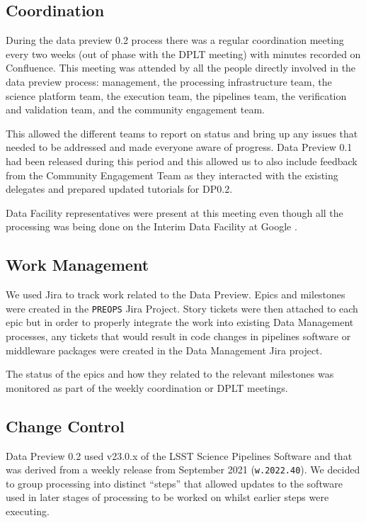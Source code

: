 \subsection{Coordination}

During the data preview 0.2 process there was a regular coordination meeting every two weeks (out of phase with the DPLT meeting) with minutes recorded on Confluence.
This meeting was attended by all the people directly involved in the data preview process: management, the processing infrastructure team, the science platform team, the execution team, the pipelines team, the verification and validation team, and the community engagement team.

This allowed the different teams to report on status and bring up any issues that needed to be addressed and made everyone aware of progress.
Data Preview 0.1 had been released during this period and this allowed us to also include feedback from the Community Engagement Team as they interacted with the existing delegates and prepared updated tutorials for DP0.2.

Data Facility representatives were present at this meeting even though all the processing was being done on the Interim Data Facility at Google \citep{2021arXiv211115030O}.

\subsection{Work Management}

We used Jira to track work related to the Data Preview.
Epics and milestones were created in the \texttt{PREOPS} Jira Project.
Story tickets were then attached to each epic but in order to properly integrate the work into existing Data Management processes, any tickets that would result in code changes in pipelines software or middleware packages were created in the Data Management Jira project.

The status of the epics and how they related to the relevant milestones was monitored as part of the weekly coordination or DPLT meetings.

\subsection{Change Control}

Data Preview 0.2 used v23.0.x of the LSST Science Pipelines Software and that was derived from a weekly release from September 2021 (\texttt{w.2022.40}).
We decided to group processing into distinct ``steps'' that allowed updates to the software used in later stages of processing to be worked on whilst earlier steps were executing.

